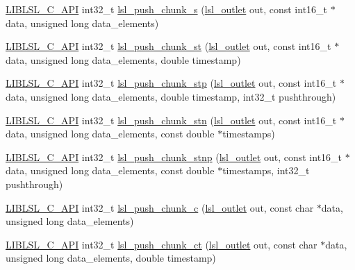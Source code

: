 \begin{DoxyCompactItemize}
\hyperlink{lsl__cpp_8h_aafd0ef1813e8be84a1420c4f1df64615}{L\+I\+B\+L\+S\+L\+\_\+\+C\+\_\+\+A\+PI} int32\+\_\+t \hyperlink{namespacelsl_ac2e4e87bd196fe5469934eaf87ecdaa2}{lsl\+\_\+push\+\_\+chunk\+\_\+s} (\hyperlink{namespacelsl_abcf512b0f66dacf86c10b165995fd50b}{lsl\+\_\+outlet} out, const int16\+\_\+t $\ast$data, unsigned long data\+\_\+elements)
\item 
\hyperlink{lsl__cpp_8h_aafd0ef1813e8be84a1420c4f1df64615}{L\+I\+B\+L\+S\+L\+\_\+\+C\+\_\+\+A\+PI} int32\+\_\+t \hyperlink{namespacelsl_a6d02c87538ca2e49831fefc79a4ef751}{lsl\+\_\+push\+\_\+chunk\+\_\+st} (\hyperlink{namespacelsl_abcf512b0f66dacf86c10b165995fd50b}{lsl\+\_\+outlet} out, const int16\+\_\+t $\ast$data, unsigned long data\+\_\+elements, double timestamp)
\item 
\hyperlink{lsl__cpp_8h_aafd0ef1813e8be84a1420c4f1df64615}{L\+I\+B\+L\+S\+L\+\_\+\+C\+\_\+\+A\+PI} int32\+\_\+t \hyperlink{namespacelsl_a8de67854b1d0c9de42e3e69997f68d0c}{lsl\+\_\+push\+\_\+chunk\+\_\+stp} (\hyperlink{namespacelsl_abcf512b0f66dacf86c10b165995fd50b}{lsl\+\_\+outlet} out, const int16\+\_\+t $\ast$data, unsigned long data\+\_\+elements, double timestamp, int32\+\_\+t pushthrough)
\item 
\hyperlink{lsl__cpp_8h_aafd0ef1813e8be84a1420c4f1df64615}{L\+I\+B\+L\+S\+L\+\_\+\+C\+\_\+\+A\+PI} int32\+\_\+t \hyperlink{namespacelsl_a66784045ca9dec23b491f56474009de4}{lsl\+\_\+push\+\_\+chunk\+\_\+stn} (\hyperlink{namespacelsl_abcf512b0f66dacf86c10b165995fd50b}{lsl\+\_\+outlet} out, const int16\+\_\+t $\ast$data, unsigned long data\+\_\+elements, const double $\ast$timestamps)
\item 
\hyperlink{lsl__cpp_8h_aafd0ef1813e8be84a1420c4f1df64615}{L\+I\+B\+L\+S\+L\+\_\+\+C\+\_\+\+A\+PI} int32\+\_\+t \hyperlink{namespacelsl_aee4448b6c1239e14f9212700c828ca5b}{lsl\+\_\+push\+\_\+chunk\+\_\+stnp} (\hyperlink{namespacelsl_abcf512b0f66dacf86c10b165995fd50b}{lsl\+\_\+outlet} out, const int16\+\_\+t $\ast$data, unsigned long data\+\_\+elements, const double $\ast$timestamps, int32\+\_\+t pushthrough)
\item 
\hyperlink{lsl__cpp_8h_aafd0ef1813e8be84a1420c4f1df64615}{L\+I\+B\+L\+S\+L\+\_\+\+C\+\_\+\+A\+PI} int32\+\_\+t \hyperlink{namespacelsl_a3dd3622f5a0fcdedbc7bf4223a08ba01}{lsl\+\_\+push\+\_\+chunk\+\_\+c} (\hyperlink{namespacelsl_abcf512b0f66dacf86c10b165995fd50b}{lsl\+\_\+outlet} out, const char $\ast$data, unsigned long data\+\_\+elements)
\item 
\hyperlink{lsl__cpp_8h_aafd0ef1813e8be84a1420c4f1df64615}{L\+I\+B\+L\+S\+L\+\_\+\+C\+\_\+\+A\+PI} int32\+\_\+t \hyperlink{namespacelsl_a9bad246099db9f07ccc795d14709eed7}{lsl\+\_\+push\+\_\+chunk\+\_\+ct} (\hyperlink{namespacelsl_abcf512b0f66dacf86c10b165995fd50b}{lsl\+\_\+outlet} out, const char $\ast$data, unsigned long data\+\_\+elements, double timestamp)

\end{DoxyCompactItemize}
